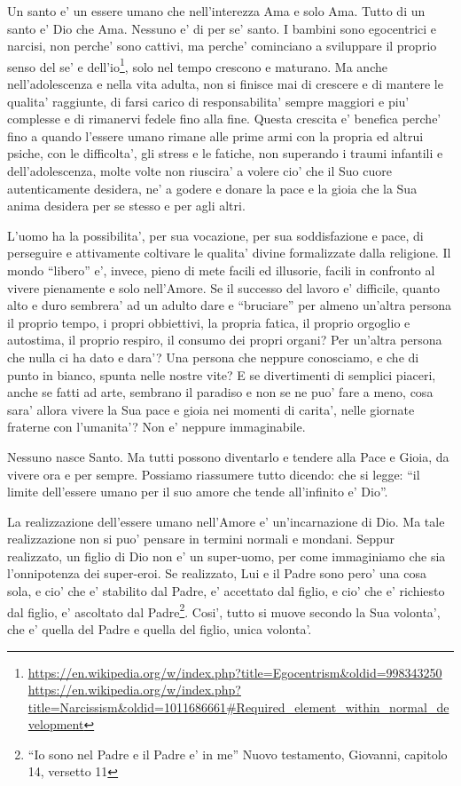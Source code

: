 Un santo e' un essere umano che nell'interezza Ama e solo Ama. Tutto di un santo e' Dio che Ama. Nessuno e' di per se' santo. I bambini sono egocentrici e narcisi, non perche' sono cattivi, ma perche' cominciano a sviluppare il proprio senso del se' e dell'io\footnote{\url{https://en.wikipedia.org/w/index.php?title=Egocentrism\&oldid=998343250} \url{https://en.wikipedia.org/w/index.php?title=Narcissism\&oldid=1011686661\#Required\_element\_within\_normal\_development}}, solo nel tempo crescono e maturano.  Ma anche nell'adolescenza e nella vita adulta, non si finisce mai di crescere e di mantere le qualita' raggiunte, di farsi carico di responsabilita' sempre maggiori e piu' complesse e di rimanervi fedele fino alla fine. Questa crescita e' benefica perche' fino a quando l'essere umano rimane alle prime armi con la propria ed altrui psiche, con le difficolta', gli stress e le fatiche, non superando i traumi infantili e dell'adolescenza, molte volte non riuscira' a volere cio' che il Suo cuore autenticamente desidera, ne' a godere e donare la pace e la gioia che la Sua anima desidera per se stesso e per agli altri.

L'uomo ha la possibilita', per sua vocazione, per sua soddisfazione e pace, di perseguire e attivamente coltivare le qualita' divine formalizzate dalla religione. 
Il mondo ``libero'' e', invece, pieno di mete facili ed illusorie, facili in confronto al vivere pienamente e solo nell'Amore. Se il successo del lavoro e' difficile, quanto alto e duro sembrera' ad un adulto dare e ``bruciare'' per almeno un'altra persona il proprio tempo, i propri obbiettivi, la propria fatica, il proprio orgoglio e autostima, il proprio respiro, il consumo dei propri organi? Per un'altra persona che nulla ci ha dato e dara'? Una persona che neppure conosciamo, e che di punto in bianco, spunta nelle nostre vite? E se divertimenti di semplici piaceri, anche se fatti ad arte, sembrano il paradiso e non se ne puo' fare a meno, cosa sara' allora vivere la Sua pace e gioia nei momenti di carita', nelle giornate fraterne con l'umanita'? Non e' neppure immaginabile. 

Nessuno nasce Santo. Ma tutti possono diventarlo e tendere alla Pace e Gioia, da vivere ora e per sempre.
Possiamo riassumere tutto dicendo:
che si legge: ``il limite dell'essere umano per il suo amore che tende all'infinito e' Dio''.

La realizzazione dell'essere umano nell'Amore e' un'incarnazione di Dio. Ma tale realizzazione non si puo' pensare in termini normali e mondani. Seppur realizzato, un figlio di Dio non e' un super-uomo, per come immaginiamo che sia l'onnipotenza dei super-eroi. Se realizzato, Lui e il Padre sono pero' una cosa sola, e cio' che e' stabilito dal Padre, e' accettato dal figlio, e cio' che e' richiesto dal figlio, e' ascoltato dal Padre\footnote{``Io sono nel Padre e il Padre e' in me'' Nuovo testamento, Giovanni, capitolo 14, versetto 11}. Cosi', tutto si muove secondo la Sua volonta', che e' quella del Padre e quella del figlio, unica volonta'.

